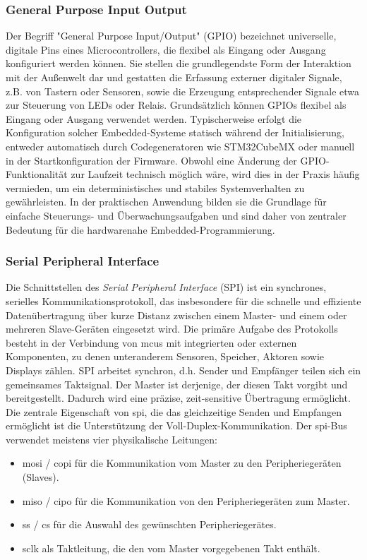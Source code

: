 \subsubsection*{General Purpose Input Output}
Der Begriff "General Purpose Input/Output" (GPIO) bezeichnet universelle, digitale Pins eines Microcontrollers, die flexibel als Eingang oder Ausgang konfiguriert werden können.
Sie stellen die grundlegendste Form der Interaktion mit der Außenwelt dar und gestatten die Erfassung externer digitaler Signale, z.B. von Tastern oder Sensoren, sowie die Erzeugung entsprechender Signale etwa zur Steuerung von LEDs oder Relais.
Grundsätzlich können GPIOs flexibel als Eingang oder Ausgang verwendet werden.
Typischerweise erfolgt die Konfiguration solcher Embedded-Systeme statisch während der Initialisierung, entweder automatisch durch Codegeneratoren wie STM32CubeMX oder manuell in der Startkonfiguration der Firmware.
Obwohl eine Änderung der GPIO-Funktionalität zur Laufzeit technisch möglich wäre, wird dies in der Praxis häufig vermieden, um ein deterministisches und stabiles Systemverhalten zu gewährleisten.
In der praktischen Anwendung bilden sie die Grundlage für einfache Steuerungs- und Überwachungsaufgaben und sind daher von zentraler Bedeutung für die hardwarenahe Embedded-Programmierung.

\subsubsection*{Serial Peripheral Interface}
Die Schnittstellen des \emph{Serial Peripheral Interface} (SPI) ist ein synchrones, serielles Kommunikationsprotokoll, das insbesondere für die schnelle und effiziente Datenübertragung über kurze Distanz zwischen einem Master- und einem oder mehreren Slave-Geräten eingesetzt wird. 
Die primäre Aufgabe des Protokolls besteht in der Verbindung von \gls{mcu}s mit integrierten oder externen Komponenten, zu denen unteranderem  Sensoren, Speicher, Aktoren sowie Displays zählen.
SPI arbeitet synchron, d.h. Sender und Empfänger teilen sich ein gemeinsames Taktsignal.
Der Master ist derjenige, der diesen Takt vorgibt und bereitgestellt.
Dadurch wird eine präzise, zeit-sensitive Übertragung ermöglicht. 
Die zentrale Eigenschaft von \gls{spi}, die das gleichzeitige Senden und Empfangen ermöglicht ist die Unterstützung der Voll-Duplex-Kommunikation.
Der \gls{spi}-Bus verwendet meistens vier physikalische Leitungen:
\begin{itemize}
	\item \gls{mosi} / \gls{copi} für die Kommunikation vom Master zu den Peripheriegeräten (Slaves).
	\item \gls{miso} / \gls{cipo} für die Kommunikation von den Peripheriegeräten zum Master.
	\item \gls{ss} / \gls{cs} für die Auswahl des gewünschten Peripheriegerätes.
	\item \gls{sclk} als Taktleitung, die den vom Master vorgegebenen Takt enthält.
\end{itemize}

